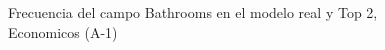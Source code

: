 \begin{figure}[H]
    \centering
    
    \caption{Frecuencia del campo Bathrooms en el modelo real y Top 2, Economicos (A-1)}
    \label{frecuency-Bathrooms-top2}
\end{figure}
